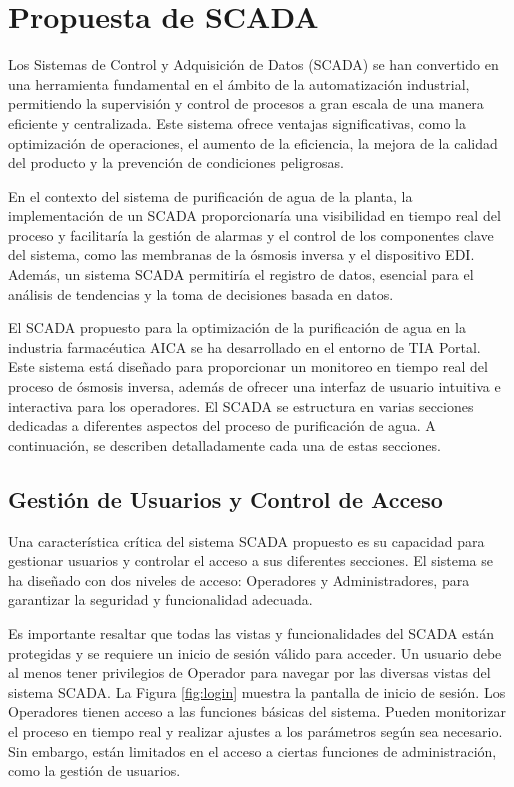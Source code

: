 \section{Propuesta de SCADA}
\label{sec:scada_proposal}
Los Sistemas de Control y Adquisición de Datos (SCADA) se han convertido en una herramienta fundamental en el ámbito de la automatización industrial, permitiendo la supervisión y control de procesos a gran escala de una manera eficiente y centralizada. Este sistema ofrece ventajas significativas, como la optimización de operaciones, el aumento de la eficiencia, la mejora de la calidad del producto y la prevención de condiciones peligrosas.

En el contexto del sistema de purificación de agua de la planta, la implementación de un SCADA proporcionaría una visibilidad en tiempo real del proceso y facilitaría la gestión de alarmas y el control de los componentes clave del sistema, como las membranas de la ósmosis inversa y el dispositivo EDI. Además, un sistema SCADA permitiría el registro de datos, esencial para el análisis de tendencias y la toma de decisiones basada en datos.

El SCADA propuesto para la optimización de la purificación de agua en la industria farmacéutica AICA se ha desarrollado en el entorno de TIA Portal. Este sistema está diseñado para proporcionar un monitoreo en tiempo real del proceso de ósmosis inversa, además de ofrecer una interfaz de usuario intuitiva e interactiva para los operadores.
El SCADA se estructura en varias secciones dedicadas a diferentes aspectos del proceso de purificación de agua. A continuación, se describen detalladamente cada una de estas secciones.


\subsection{Gestión de Usuarios y Control de Acceso}

Una característica crítica del sistema SCADA propuesto es su capacidad para gestionar usuarios y controlar el acceso a sus diferentes secciones. El sistema se ha diseñado con dos niveles de acceso: Operadores y Administradores, para garantizar la seguridad y funcionalidad adecuada.

Es importante resaltar que todas las vistas y funcionalidades del SCADA están protegidas y se requiere un inicio de sesión válido para acceder. Un usuario debe al menos tener privilegios de Operador para navegar por las diversas vistas del sistema SCADA. La Figura \ref{fig:login} muestra la pantalla de inicio de sesión.
Los Operadores tienen acceso a las funciones básicas del sistema. Pueden monitorizar el proceso en tiempo real y realizar ajustes a los parámetros según sea necesario. Sin embargo, están limitados en el acceso a ciertas funciones de administración, como la gestión de usuarios.

